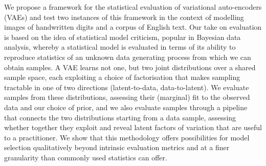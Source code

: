 We propose a framework for the statistical evaluation of variational auto-encoders (VAEs) and test two instances of this framework in the context of modelling images of handwritten digits and a corpus of English text.
Our take on evaluation is based on the idea of statistical model criticism, popular in Bayesian data analysis, whereby a statistical model is evaluated in terms of its ability to reproduce statistics of an unknown data generating process from which we can obtain samples.
A VAE learns not one, but two joint distributions over a shared sample space,
each exploiting a choice of factorisation that makes sampling tractable in one of two directions (latent-to-data, data-to-latent).  
We evaluate samples from these distributions, assessing their (marginal) fit to the observed data and our choice of prior, and we also evaluate samples through a pipeline that connects the two distributions starting from a data sample, assessing whether together they exploit and reveal latent factors of variation that are useful to a practitioner. 
We show that this methodology offers possibilities for model selection qualitatively beyond intrinsic evaluation metrics and at a finer granularity than commonly used statistics can offer.



